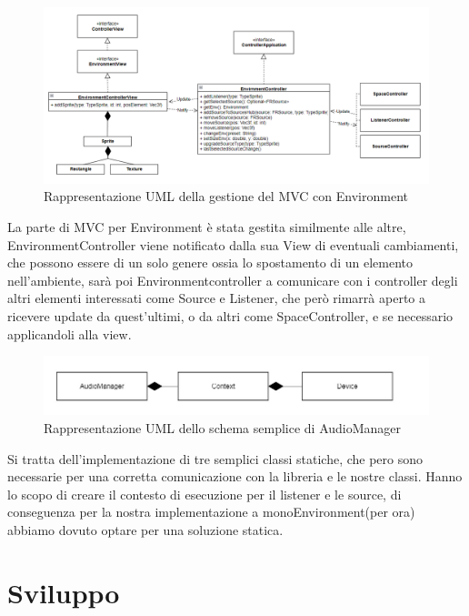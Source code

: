 \documentclass[a4paper,12pt]{report}
\begin{document}
%
\begin{figure}[H]
\centering{}
\includegraphics[width=\textwidth]{img/environment/EnvironmentMVC.png}
\caption{Rappresentazione UML della gestione del MVC con Environment}
\label{img:environmentmvc}
\end{figure}
La parte di MVC per Environment è stata gestita similmente alle altre, EnvironmentController viene notificato dalla sua View di eventuali cambiamenti, che possono essere di un solo genere ossia lo spostamento di un elemento nell'ambiente, sarà poi Environmentcontroller a comunicare con i controller degli altri elementi interessati come Source e Listener, che però rimarrà  aperto a ricevere  update da quest'ultimi, o da altri come SpaceController, e se necessario applicandoli alla view.
%
\begin{figure}[H]
\centering{}
\includegraphics[width=\textwidth]{img/environment/AudioManager.png}
\caption{Rappresentazione UML dello schema semplice di AudioManager}
\label{img:audiomanager}
\end{figure}
Si tratta dell'implementazione di tre semplici classi statiche, che pero sono necessarie per una corretta comunicazione con la libreria e le nostre classi. Hanno lo scopo di creare il contesto di esecuzione per il listener e le source, di conseguenza per la nostra implementazione a monoEnvironment(per ora)  abbiamo dovuto optare per una soluzione statica.
%

\chapter{Sviluppo}
\end{document}
